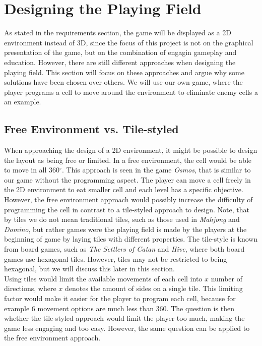 \section{Designing the Playing Field}
\label{sec:designing_playing_field}
As stated in the requirements section, the game will be displayed as a 2D environment instead of 3D, since the focus of this project is not on the graphical presentation of the game, but on the combination of engagin gameplay and education. However, there are still different approaches when designing the playing field. This section will focus on these approaches and argue why some solutions have been chosen over others. We will use our own game, where the player programs a cell to move around the environment to eliminate enemy cells a an example.

\subsection{Free Environment vs. Tile-styled}

When approaching the design of a 2D environment, it might be possible to design the layout as being free or limited.
In a free environment, the cell would be able to move in all 360$^{\circ}$.
This approach is seen in the game \textit{Osmos}, that is similar to our game without the programming aspect.
The player can move a cell freely in the 2D environment to eat smaller cell and each level has a specific objective.
However, the free environment approach would possibly increase the difficulty of programming the cell in contrast to a tile-styled approach to design.
Note, that by tiles we do not mean traditional tiles, such as those used in \textit{Mahjong} and \textit{Domino}, but rather games were the playing field is made by the players at the beginning of game by laying tiles with different properties.
The tile-style is known from board games, such as \textit{The Settlers of Catan} and \textit{Hive}, where both board games use hexagonal tiles.
However, tiles may not be restricted to being hexagonal, but we will discuss this later in this section.\\

Using tiles would limit the available movements of each cell into $x$ number of directions, where $x$ denotes the amount of sides on a single tile. This limiting factor would make it easier for the player to program each cell, because for example 6 movement options are much less than 360. The question is then whether the tile-styled approach would limit the player too much, making the game less engaging and too easy. However, the same question can be applied to the free environment approach.\\

